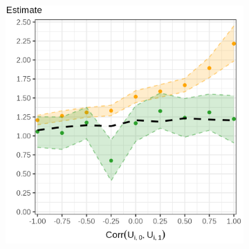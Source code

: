 \documentclass[dvipsnames]{beamer} %
\begin{document}
\begin{frame}
{{\begin{figure}
\begin{subfigure}[c]{0.525\textwidth}
                \includegraphics[width=\textwidth]{
                    ../text/sections/figures/rho-indirecteffect-bias.png}
            \end{subfigure}
        \end{figure}
    }}
\end{frame}
\end{document}
